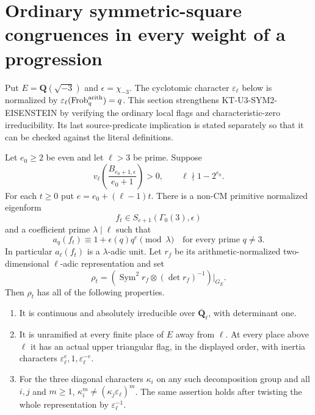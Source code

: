 \section{Ordinary symmetric-square congruences in every weight of a progression}
\label{sec:kt-ordinary-symmetric-square}

Put $E=\mathbf Q(\sqrt{-3})$ and $\epsilon=\chi_{-3}$.
The cyclotomic character $\varepsilon_\ell$ below is normalized
by $\varepsilon_\ell(\operatorname{Frob}^{\rm arith}_q)=q$.
This section strengthens KT-U3-SYM2-EISENSTEIN by verifying
the ordinary local flags and characteristic-zero irreducibility.
Its last source-predicate implication is stated separately so
that it can be checked against the literal definitions.

\begin{theorem}
Let $e_0\geq2$ be even and let $\ell>3$ be prime. Suppose
\[
 v_\ell\!\left(\frac{B_{e_0+1,\epsilon}}{e_0+1}\right)>0,
 \qquad \ell\nmid1-2^{e_0}.                         \tag{OS.1}
\]
For each $t\geq0$ put $e=e_0+(\ell-1)t$. There is a
non-CM primitive normalized eigenform
\[
 f_t\in S_{e+1}(\Gamma_0(3),\epsilon)
\]
and a coefficient prime $\lambda\mid\ell$ such that
\[
 a_q(f_t)\equiv1+\epsilon(q)q^e\pmod\lambda
                       \quad\text{for every prime }q\ne3.
                                                               \tag{OS.2}
\]
In particular $a_\ell(f_t)$ is a $\lambda$-adic unit.
Let $r_f$ be its arithmetic-normalized two-dimensional
$\ell$-adic representation and set
\[
 \rho_t=\left(\operatorname{Sym}^2r_f\otimes
                         (\det r_f)^{-1}\right)|_{G_E}.
                                                               \tag{OS.3}
\]
Then $\rho_t$ has all of the following properties.
\begin{enumerate}
\item It is continuous and absolutely irreducible over
      $\overline{\mathbf Q}_\ell$, with determinant one.
\item It is unramified at every finite place of $E$ away from
      $\ell$. At every place above $\ell$ it has an actual
      upper triangular flag, in the displayed order, with
      inertia characters
      $\varepsilon_\ell^e,1,\varepsilon_\ell^{-e}$.
\item For the three diagonal characters $\kappa_i$ on any
      such decomposition group and all $i,j$ and $m\geq1$,
      $\kappa_i^m\ne(\kappa_j\varepsilon_\ell)^m$.
      The same assertion holds after twisting the whole
      representation by $\varepsilon_\ell^{-1}$.

\end{enumerate}
\end{theorem}
